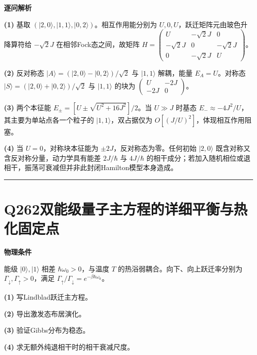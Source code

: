 \documentclass[UTF8,a4paper,11pt,oneside,openany]{ctexbook}
\begin{document}
\par\medskip\noindent\textbf{逐问解析}
\par\noindent\textbf{(1)} 基取 \((|2,0\rangle,|1,1\rangle,|0,2\rangle)\)。相互作用能分别为 \(U,0,U\)，跃迁矩阵元由玻色升降算符给 \(-\sqrt2J\) 在相邻Fock态之间，故矩阵 \(H=\begin{pmatrix}U&-\sqrt2J&0\\-\sqrt2J&0&-\sqrt2J\\0&-\sqrt2J&U\end{pmatrix}\)。
\par\noindent\textbf{(2)} 反对称态 \(|A\rangle=(|2,0\rangle-|0,2\rangle)/\sqrt2\) 与 \(|1,1\rangle\) 解耦，能量 \(E_A=U\)。对称态 \(|S\rangle=(|2,0\rangle+|0,2\rangle)/\sqrt2\) 与 \(|1,1\rangle\) 的块为 \(\begin{pmatrix}U&-2J\\-2J&0\end{pmatrix}\)。
\par\noindent\textbf{(3)} 两个本征能 \(E_\pm=[U\pm\sqrt{U^2+16J^2}]/2\)。当 \(U\gg J\) 时基态 \(E_-\approx-4J^2/U\)，其主要为单站点各一个粒子的 \(|1,1\rangle\)，双占据仅为 \(O[(J/U)^2]\)，体现相互作用阻塞。
\par\noindent\textbf{(4)} 当 \(U=0\)，对称块本征能为 \(\pm2J\)，反对称态为零。任何初始 \(|2,0\rangle\) 既含对称又含反对称分量，动力学具有能差 \(2J/\hbar\) 与 \(4J/\hbar\) 的相干成分；若加入随机相位或退相干，振荡可衰减但并非此封闭Hamilton模型本身造成。

\par\bigskip\hrule\bigskip
\section*{Q262\quad 双能级量子主方程的详细平衡与热化固定点}
\textbf{物理条件}\par 能级 \(|0\rangle,|1\rangle\) 相差 \(\hbar\omega_0>0\)，与温度 \(T\) 的热浴弱耦合。向下、向上跃迁率分别为 \(\Gamma_\downarrow,\Gamma_\uparrow>0\)，满足 \(\Gamma_\uparrow/\Gamma_\downarrow=e^{-\beta\hbar\omega_0}\)。
\par\noindent\textbf{(1)} 写Lindblad跃迁主方程。
\par\noindent\textbf{(2)} 导出激发态布居演化。
\par\noindent\textbf{(3)} 验证Gibbs分布为稳态。
\par\noindent\textbf{(4)} 求无额外纯退相干时的相干衰减尺度。
\end{document}
